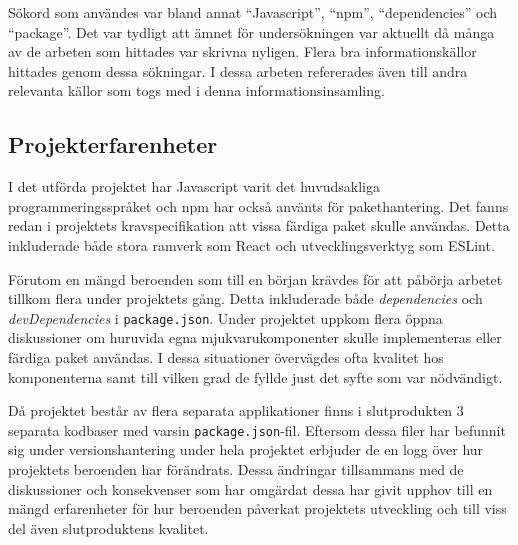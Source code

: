 Sökord som användes var bland annat ``Javascript'', ``npm'', ``dependencies'' och ``package''. Det var tydligt att ämnet för undersökningen var aktuellt då många av de arbeten som hittades var skrivna nyligen. Flera bra informationskällor hittades genom dessa sökningar. I dessa arbeten refererades även till andra relevanta källor som togs med i denna informationsinsamling.

\subsection{Projekterfarenheter}
I det utförda projektet har Javascript varit det huvudsakliga programmeringsspråket och npm har också använts för pakethantering. Det fanns redan i projektets kravspecifikation att vissa färdiga paket skulle användas. Detta inkluderade både stora ramverk som React och utvecklingsverktyg som ESLint.

Förutom en mängd beroenden som till en början krävdes för att påbörja arbetet tillkom flera under projektets gång. Detta inkluderade både \textit{dependencies} och \textit{devDependencies} i \texttt{package.json}. Under projektet uppkom flera öppna diskussioner om huruvida egna mjukvarukomponenter skulle implementeras eller färdiga paket användas. I dessa situationer övervägdes ofta kvalitet hos komponenterna samt till vilken grad de fyllde just det syfte som var nödvändigt.

Då projektet består av flera separata applikationer finns i slutprodukten 3 separata kodbaser med varsin \texttt{package.json}-fil. Eftersom dessa filer har befunnit sig under versionshantering under hela projektet erbjuder de en logg över hur projektets beroenden har förändrats. Dessa ändringar tillsammans med de diskussioner och konsekvenser som har omgärdat dessa har givit upphov till en mängd erfarenheter för hur beroenden påverkat projektets utveckling och till viss del även slutproduktens kvalitet.
